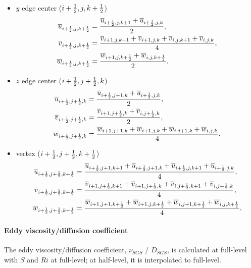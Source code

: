 \begin{itemize}
  \item $y$ edge center ($i+\frac{1}{2},j,k+\frac{1}{2}$)
    \begin{align}
      \overline{u}_{i+\frac{1}{2},j,k+\frac{1}{2}} &=
      \frac{\overline{u}_{i+\frac{1}{2},j,k+1}+\overline{u}_{i+\frac{1}{2},j,k}}{2}, \\
      \overline{v}_{i+\frac{1}{2},j,k+\frac{1}{2}} &=
      \frac{\overline{v}_{i+1,j,k+1}+\overline{v}_{i+1,j,k}+\overline{v}_{i,j,k+1}+\overline{v}_{i,j,k}}{4}, \\
      \overline{w}_{i+\frac{1}{2},j,k+\frac{1}{2}} &=
      \frac{\overline{w}_{i+1,j,k+\frac{1}{2}}+\overline{w}_{i,j,k+\frac{1}{2}}}{2}.
    \end{align}

  \item $z$ edge center ($i+\frac{1}{2},j+\frac{1}{2},k$)
    \begin{align}
      \overline{u}_{i+\frac{1}{2},j+\frac{1}{2},k} &=
      \frac{\overline{u}_{i+\frac{1}{2},j+1,k}+\overline{u}_{i+\frac{1}{2},j,k}}{2}, \\
      \overline{v}_{i+\frac{1}{2},j+\frac{1}{2},k} &=
      \frac{\overline{v}_{i+1,j+\frac{1}{2},k}+\overline{v}_{i,j+\frac{1}{2},k}}{2}, \\
      \overline{w}_{i+\frac{1}{2},j+\frac{1}{2},k} &=
      \frac{\overline{w}_{i+1,j+1,k}+\overline{w}_{i+1,j,k}+\overline{w}_{i,j+1,k}+\overline{w}_{i,j,k}}{4}.
    \end{align}

  \item vertex ($i+\frac{1}{2},j+\frac{1}{2},k+\frac{1}{2}$)
    \begin{align}
      \overline{u}_{i+\frac{1}{2},j+\frac{1}{2},k+\frac{1}{2}} &=
      \frac{\overline{u}_{i+\frac{1}{2},j+1,k+1}+\overline{u}_{i+\frac{1}{2},j+1,k}+\overline{u}_{i+\frac{1}{2},j,k+1}+\overline{u}_{i+\frac{1}{2},j,k}}{4}, \\
      \overline{v}_{i+\frac{1}{2},j+\frac{1}{2},k+\frac{1}{2}} &=
      \frac{\overline{v}_{i+1,j+\frac{1}{2},k+1}+\overline{v}_{i+1,j+\frac{1}{2},k}+\overline{v}_{i,j+\frac{1}{2},k+1}+\overline{v}_{i,j+\frac{1}{2},k}}{4}, \\
      \overline{w}_{i+\frac{1}{2},j+\frac{1}{2},k+\frac{1}{2}} &=
      \frac{\overline{w}_{i+1,j+1,k+\frac{1}{2}}+\overline{w}_{i+1,j,k+\frac{1}{2}}+\overline{w}_{i,j+1,k+\frac{1}{2}}+\overline{w}_{i,j,k+\frac{1}{2}}}{4}.
    \end{align}
\end{itemize}

\paragraph{Eddy viscosity/diffusion coefficient}
The eddy viscosity/diffusion coefficient, $\nu_{SGS}$ / $D_{SGS}$, is calculated at full-level with $S$ and $Ri$ at full-level; at half-level, it is interpolated to full-level.


